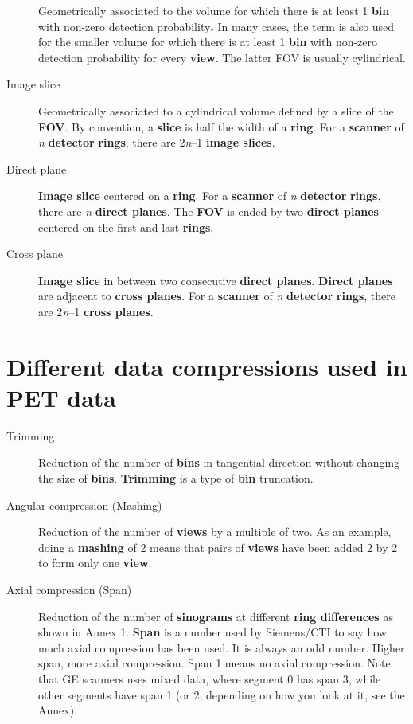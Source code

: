 \documentclass{article}
\begin{document}
\begin{description}
Geometrically associated to the volume for which there is at 
least 1 \textbf{bin} with non-zero detection probability\textbf{.} In many 
cases, the term is also used for the smaller volume for which 
there is at least 1 \textbf{bin} with non-zero detection probability 
for every \textbf{view}. The latter FOV is usually cylindrical.
\item[Image slice] 
Geometrically associated to a cylindrical volume defined by 
a slice of the \textbf{FOV}. By convention, a \textbf{slice} is half the 
width of a \textbf{ring}. For a \textbf{scanner} of \textit{n} \textbf{detector} \textbf{rings}, 
there are 2\textit{n}--1 \textbf{image slices}.
\item[Direct plane] 
\textbf{Image slice} centered on a \textbf{ring}. For a \textbf{scanner} of \textit{n} \textbf{detector} \textbf{rings}, 
there are \textit{n} \textbf{direct planes}. The \textbf{FOV} is ended by two \textbf{direct 
planes} centered on the first and last \textbf{rings}.
\item[Cross plane] 
\textbf{Image slice} in between two consecutive \textbf{direct planes}. \textbf{Direct 
planes} are adjacent to \textbf{cross planes}. For a \textbf{scanner} of \textit{n} \textbf{detector} \textbf{rings}, 
there are 2\textit{n}--1 \textbf{cross planes}.
\end{description}

\section*{Different data compressions used in PET data}
\begin{description}
\item[Trimming] 
Reduction of the number of \textbf{bins} in tangential direction without 
changing the size of \textbf{bins}. \textbf{Trimming} is a type of \textbf{bin} 
truncation.
\item[Angular compression (Mashing)] 
Reduction of the number of \textbf{views} by a multiple of two. As 
an example, doing a \textbf{mashing} of 2 means that pairs of \textbf{views} 
have been added 2 by 2 to form only one \textbf{view}.
\item[Axial compression (Span)] 
Reduction of the number of \textbf{sinograms} at different \textbf{ring 
differences} as shown in Annex 1. \textbf{Span} is a number used by 
Siemens/CTI to say how much axial compression has been used. It is always 
an odd number. Higher span, more axial compression. Span 1 means 
no axial compression. Note that GE scanners uses mixed data, 
where segment 0 has span 3, while other segments have span 1 (or 2, depending on how you look at it, 
see the Annex).
\end{description}
\end{document}
